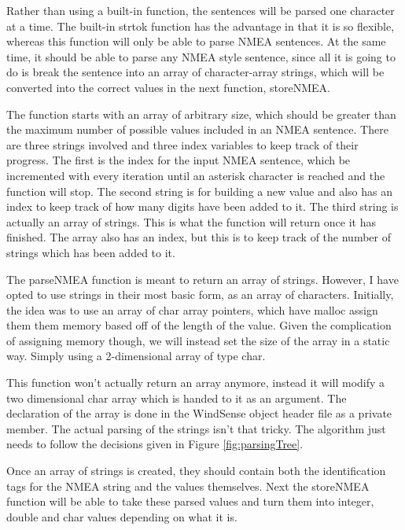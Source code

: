 \documentclass[letterpaper]{article}
\begin{document}
Rather than using a built-in function, the sentences will be parsed one character at a time. The built-in strtok function has the advantage in that it is so flexible, whereas this function will only be able to parse NMEA sentences. At the same time, it should be able to parse any NMEA style sentence, since all it is going to do is break the sentence into an array of character-array strings, which will be converted into the correct values in the next function, storeNMEA.

The function starts with an array of arbitrary size, which should be greater than the maximum number of possible values included in an NMEA sentence. There are three strings involved and three index variables to keep track of their progress. The first is the index for the input NMEA sentence, which be incremented with every iteration until an asterisk character is reached and the function will stop. The second string is for building a new value and also has an index to keep track of how many digits have been added to it. The third string is actually an array of strings. This is what the function will return once it has finished. The array also has an index, but this is to keep track of the number of strings which has been added to it.

The parseNMEA function is meant to return an array of strings. However, I have opted to use strings in their most basic form, as an array of characters. Initially, the idea was to use an array of char array pointers, which have malloc assign them them memory based off of the length of the value. Given the complication of assigning memory though, we will instead set the size of the array in a static way. Simply using a 2-dimensional array of type char. 

This function won't actually return an array anymore, instead it will modify a two dimensional char array which is handed to it as an argument. The declaration of the array is done in the WindSense object header file as a private member. The actual parsing of the strings isn't that tricky. The algorithm just needs to follow the decisions given in Figure \ref{fig:parsingTree}. 

Once an array of strings is created, they should contain both the identification tags for the NMEA string and the values themselves. Next the storeNMEA function will be able to take these parsed values and turn them into integer, double and char values depending on what it is.
\end{document}
